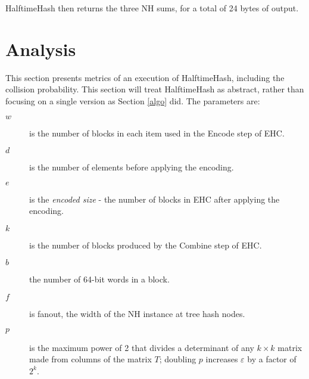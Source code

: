 \documentclass[runningheads]{llncs}
\begin{document}
HalftimeHash then returns the three NH sums, for a total of 24 bytes of output.







\section{Analysis}
\label{analysis}

This section presents metrics of an execution of HalftimeHash, including the collision probability.%
This section will treat HalftimeHash as abstract, rather than focusing on a single version as Section \ref{algo} did.
The parameters are:

\begin {description}
\item[$w$] is the number of blocks in each item used in the Encode step of EHC.
\item[$d$] is the number of elements before applying the encoding.
\item[$e$] is the {\em encoded size} - the number of blocks in EHC after applying the encoding.
\item[$k$] is the number of blocks produced by the Combine step of EHC.
\item[$b$] the number of 64-bit words in a block.
\item[$f$] is fanout, the width of the NH instance at tree hash nodes.
\item[$p$] is the maximum power of 2 that divides a determinant of any $k \times k$ matrix made from columns of the matrix $T$; doubling $p$ increases $\varepsilon$ by a factor of $2^k$.
\end{description}
\end{document}
